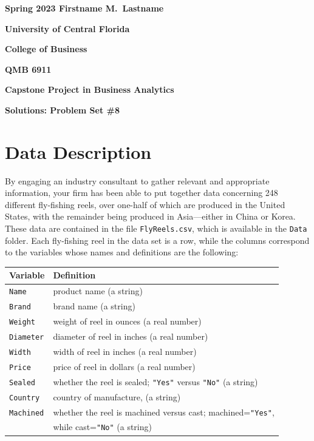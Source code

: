 \documentclass[11pt]{paper}
\begin{document}

\pagestyle{empty}
{\noindent\bf Spring 2023 \hfill Firstname M.~Lastname}
\vskip 16pt
\centerline{\bf University of Central Florida}
\centerline{\bf College of Business}
\vskip 16pt
\centerline{\bf QMB 6911}
\centerline{\bf Capstone Project in Business Analytics}
\vskip 10pt
\centerline{\bf Solutions:  Problem Set \#8}
\vskip 32pt
\noindent
% 
% 
\section{Data Description}
% 
By engaging an industry consultant to gather relevant and appropriate 
information, your firm has been able to put together data concerning 248 
different fly-fishing reels, over one-half of which are produced in the 
United States, with the remainder being produced in Asia---either in China 
or Korea.  These data are contained in the file {\tt FlyReels.csv}, which is
available in the {\tt Data} folder.
Each fly-fishing reel in the data set is a row, while the columns correspond 
to the variables whose names and definitions are the following:
\bigskip
\begin{table}[ht]
\centering
\begin{tabular}{ll}
  \hline
    Variable & Definition \\
  \hline

    {\tt Name}        &product name (a string) \\ 
    {\tt Brand}       &brand name (a string) \\ 
    {\tt Weight}      &weight of reel in ounces (a real number) \\ 
    {\tt Diameter}    &diameter of reel in inches (a real number) \\ 
    {\tt Width}       &width of reel in inches (a real number) \\ 
    {\tt Price}       &price of reel in dollars (a real number) \\ 
    {\tt Sealed}      &whether the reel is sealed; {\tt "Yes"} versus
                        {\tt "No"} (a string) \\ 
    {\tt Country}     &country of manufacture, (a string) \\ 
    {\tt Machined}    &whether the reel is machined versus cast;
                        machined={\tt "Yes"}, \\ 
                      &while cast={\tt "No"} (a string) \\ 
  \hline
\end{tabular}
\end{table}
\end{document}
